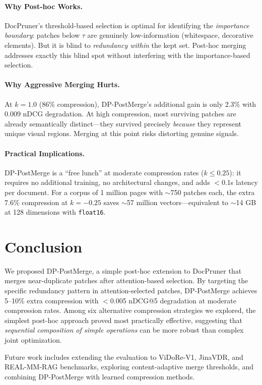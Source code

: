 \documentclass[11pt]{article}
\begin{document}
\paragraph{Why Post-hoc Works.}
DocPruner's threshold-based selection is optimal for identifying the \emph{importance boundary}: patches below $\tau$ are genuinely low-information (whitespace, decorative elements).
But it is blind to \emph{redundancy within} the kept set.
Post-hoc merging addresses exactly this blind spot without interfering with the importance-based selection.

\paragraph{Why Aggressive Merging Hurts.}
At $k=1.0$ (86\% compression), DP-PostMerge's additional gain is only 2.3\% with 0.009 nDCG degradation.
At high compression, most surviving patches are already semantically distinct---they survived precisely \emph{because} they represent unique visual regions.
Merging at this point risks distorting genuine signals.

\paragraph{Practical Implications.}
DP-PostMerge is a ``free lunch'' at moderate compression rates ($k \leq 0.25$): it requires no additional training, no architectural changes, and adds $<$0.1s latency per document.
For a corpus of 1 million pages with $\sim$750 patches each, the extra 7.6\% compression at $k=-0.25$ saves $\sim$57 million vectors---equivalent to $\sim$14 GB at 128 dimensions with \texttt{float16}.


\section{Conclusion}

We proposed DP-PostMerge, a simple post-hoc extension to DocPruner that merges near-duplicate patches after attention-based selection.
By targeting the specific redundancy pattern in attention-selected patches, DP-PostMerge achieves 5--10\% extra compression with $<$0.005 nDCG@5 degradation at moderate compression rates.
Among six alternative compression strategies we explored, the simplest post-hoc approach proved most practically effective, suggesting that \emph{sequential composition of simple operations} can be more robust than complex joint optimization.

Future work includes extending the evaluation to ViDoRe-V1, JinaVDR, and REAL-MM-RAG benchmarks, exploring content-adaptive merge thresholds, and combining DP-PostMerge with learned compression methods.




\end{document}
